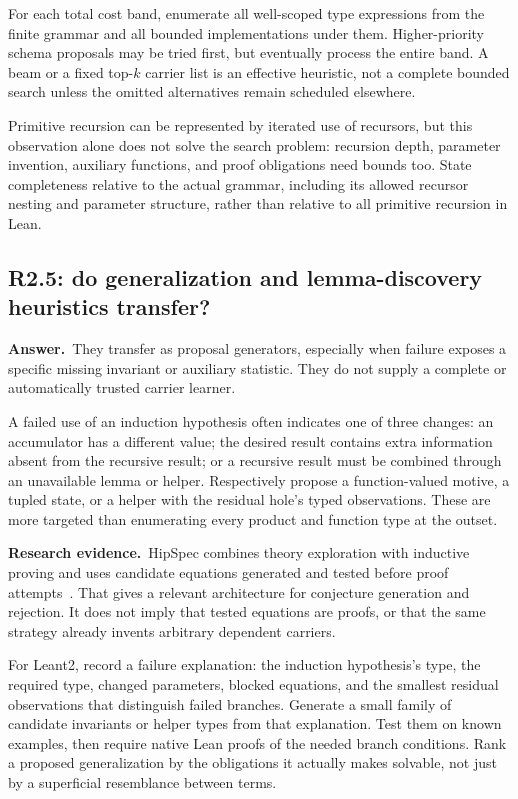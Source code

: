 \documentclass[11pt,a4paper]{article}
\theoremstyle{definition}
\theoremstyle{remark}
\newcommand{\ans}{\noindent\textbf{Answer.}\ }
\newcommand{\lit}{\par\noindent\textbf{Research evidence.}\ }
\begin{document}
For each total cost band, enumerate all well-scoped type expressions from the
finite grammar and all bounded implementations under them. Higher-priority
schema proposals may be tried first, but eventually process the entire band.
A beam or a fixed top-$k$ carrier list is an effective heuristic, not a complete
bounded search unless the omitted alternatives remain scheduled elsewhere.

Primitive recursion can be represented by iterated use of recursors, but this
observation alone does not solve the search problem: recursion depth, parameter
invention, auxiliary functions, and proof obligations need bounds too. State
completeness relative to the actual grammar, including its allowed recursor
nesting and parameter structure, rather than relative to all primitive
recursion in Lean.

\subsection{R2.5: do generalization and lemma-discovery heuristics transfer?}\label{q:R2.5}
\ans They transfer as proposal generators, especially when failure exposes a
specific missing invariant or auxiliary statistic. They do not supply a
complete or automatically trusted carrier learner.

A failed use of an induction hypothesis often indicates one of three changes:
an accumulator has a different value; the desired result contains extra
information absent from the recursive result; or a recursive result must be
combined through an unavailable lemma or helper. Respectively propose a
function-valued motive, a tupled state, or a helper with the residual hole's
typed observations. These are more targeted than enumerating every product
and function type at the outset.

\lit HipSpec combines theory exploration with inductive proving and uses
candidate equations generated and tested before proof attempts~\cite{hipspec}.
That gives a relevant architecture for conjecture generation and rejection.
It does not imply that tested equations are proofs, or that the same strategy
already invents arbitrary dependent carriers.

For Leant2, record a failure explanation: the induction hypothesis's type,
the required type, changed parameters, blocked equations, and the smallest
residual observations that distinguish failed branches. Generate a small
family of candidate invariants or helper types from that explanation.
Test them on known examples, then require native Lean proofs of the needed
branch conditions. Rank a proposed generalization by the obligations it
actually makes solvable, not just by a superficial resemblance between terms.
\end{document}
